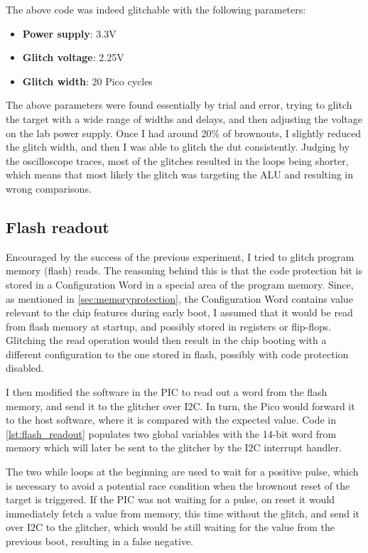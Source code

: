 \documentclass[a4paper,english,twoside,10pt]{article}
\begin{document}
The above code was indeed glitchable with the following parameters:
\begin{itemize}
	\item \textbf{Power supply}: 3.3V
	\item \textbf{Glitch voltage}: 2.25V
	\item \textbf{Glitch width}: 20 Pico cycles
\end{itemize}

The above parameters were found essentially by trial and error, trying to glitch the target with a wide range of widths and delays, and then adjusting the voltage on the lab power supply. Once I had around 20\% of brownouts, I slightly reduced the glitch width, and then I was able to glitch the \gls{dut} consistently.
Judging by the oscilloscope traces, most of the glitches resulted in the loops being shorter, which means that most likely the glitch was targeting the ALU and resulting in wrong comparisons.

\subsection{Flash readout}\label{sect:flashreadout}
Encouraged by the success of the previous experiment, I tried to glitch program memory (flash) reads. The reasoning behind this is that the code protection bit is stored in a Configuration Word in a special area of the program memory. Since, as mentioned in \cref{sec:memoryprotection}, the Configuration Word contains value relevant to the chip features during early boot, I assumed that it would be read from flash memory at startup, and possibly stored in registers or flip-flops. Glitching the read operation would then result in the chip booting with a different configuration to the one stored in flash, possibly with code protection disabled.

I then modified the software in the PIC to read out a word from the flash memory, and send it to the glitcher over I2C. In turn, the Pico would forward it to the host software, where it is compared with the expected value. Code in \cref{lst:flash_readout} populates two global variables with the 14-bit word from memory which will later be sent to the glitcher by the I2C interrupt handler.

The two while loops at the beginning are used to wait for a positive pulse, which is necessary to avoid a potential race condition when the brownout reset of the target is triggered. If the PIC was not waiting for a pulse, on reset it would immediately fetch a value from memory, this time without the glitch, and send it over I2C to the glitcher, which would be still waiting for the value from the previous boot, resulting in a false negative.
\end{document}
